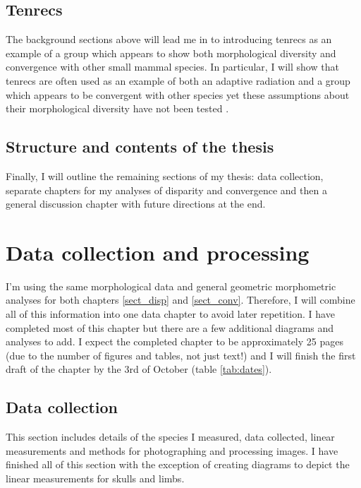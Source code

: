 \documentclass[12pt,a4paper]{article}
\begin{document}
	\subsection{Tenrecs}
		\label{int_tenrecs}
		The background sections above will lead me in to introducing tenrecs as an example of a group which appears to show both morphological diversity and convergence with other small mammal species. In particular, I will show that tenrecs are often used as an example of both an adaptive radiation and a group which appears to be convergent with other species \citep[e.g.][]{Eisenberg1969, Soarimalala2011, Olson2013} yet these assumptions about their morphological diversity have not been tested . 
			 
	\subsection{Structure and contents of the thesis}
		\label{int_struc} 
		Finally, I will outline the remaining sections of my thesis: data collection, separate chapters for my analyses of disparity and convergence and then a general discussion chapter with future directions at the end.

\section{Data collection and processing}
	
	I'm using the same morphological data and general geometric morphometric analyses for both chapters \ref{sect_disp} and \ref*{sect_conv}. Therefore, I will combine all of this information into one data chapter to avoid later repetition. I have completed most of this chapter but there are a few additional diagrams and analyses to add. I expect the completed chapter to be approximately 25 pages (due to the number of figures and tables, not just text!) and I will finish the first draft of the chapter by the 3rd of October (table \ref{tab:dates}).

	\subsection{Data collection}
		This section includes details of the species I measured, data collected, linear measurements and methods for photographing and processing images. I have finished all of this section with the exception of creating diagrams to depict the linear measurements for skulls and limbs.
\end{document}
